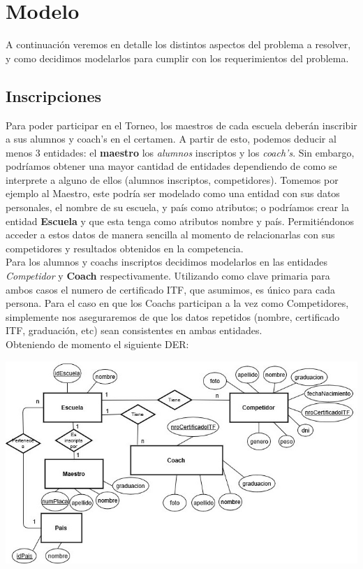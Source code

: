 \section{Modelo}

A continuación veremos en detalle los distintos aspectos del problema a resolver, y como decidimos modelarlos para cumplir con los requerimientos del problema.

\subsection{Inscripciones}

Para poder participar en el Torneo, los maestros de cada escuela deberán inscribir a sus alumnos y coach's en el certamen. A partir de esto, podemos deducir al menos 3 entidades: el \textbf{maestro} los \emph{alumnos} inscriptos y los \emph{coach's}. Sin embargo, podríamos obtener una mayor cantidad de entidades dependiendo de como se interprete a alguno de ellos (alumnos inscriptos, competidores). Tomemos por ejemplo al Maestro, este podría ser modelado como una entidad con sus datos personales, el nombre de su escuela, y país como atributos; o podríamos crear la entidad \textbf{Escuela} y que esta tenga como atributos nombre y país. Permitiéndonos acceder a estos datos de manera sencilla al momento de relacionarlas con sus competidores y resultados obtenidos en la competencia.\\

Para los alumnos y coachs inscriptos decidimos modelarlos en las entidades \emph{Competidor} y \textbf{Coach} respectivamente. Utilizando como clave primaria para ambos casos el numero de certificado ITF, que asumimos, es único para cada persona. Para el caso en que los Coachs participan a la vez como Competidores, simplemente nos aseguraremos de que los datos repetidos (nombre, certificado ITF, graduación, etc) sean consistentes en ambas entidades.\\

Obteniendo de momento el siguiente DER:

\includegraphics[scale=0.75]{inscripcion.jpg}


